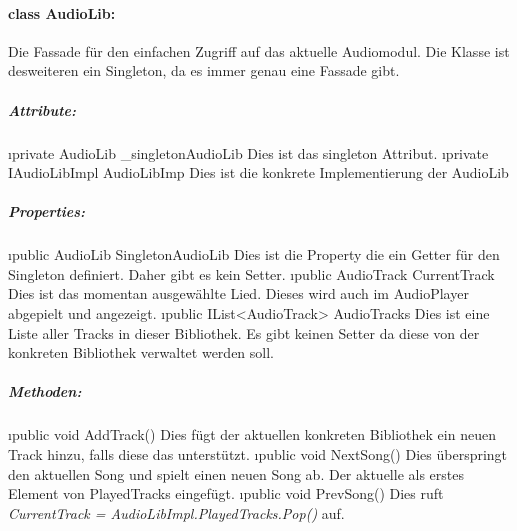\documentclass[../entwurf.tex]{subfiles}
\begin{document}
			\paragraph{class AudioLib:}
				Die Fassade für den einfachen Zugriff auf das aktuelle Audiomodul.
				Die Klasse ist desweiteren ein Singleton, da es immer genau eine Fassade gibt.
				\subparagraph{Attribute:}
					\begin{itemize}
						\i{private AudioLib \_singletonAudioLib} Dies ist das singleton Attribut.
						\i{private IAudioLibImpl AudioLibImp} Dies ist die konkrete Implementierung der
						AudioLib
					\end{itemize}
				\subparagraph{Properties:}
					\begin{itemize}
						\i{public AudioLib SingletonAudioLib} Dies ist die Property die ein Getter für den 
						Singleton definiert. Daher gibt es kein Setter.
						\i{public AudioTrack CurrentTrack} Dies ist das momentan ausgewählte Lied. Dieses
						wird auch im AudioPlayer abgepielt und angezeigt. 
						\i{public IList<AudioTrack> AudioTracks} Dies ist eine Liste aller Tracks in dieser 
						Bibliothek. Es gibt keinen Setter da diese von der konkreten Bibliothek verwaltet werden soll.
					\end{itemize}
				\subparagraph{Methoden:}
					\begin{itemize}
						\i{public void AddTrack()} Dies fügt der aktuellen konkreten Bibliothek ein neuen Track hinzu, 
						falls diese das unterstützt.
						\i{public void NextSong()} Dies überspringt den aktuellen Song und spielt einen neuen Song ab. 
						Der aktuelle als erstes Element von PlayedTracks eingefügt.
						\i{public void PrevSong()} Dies ruft \textit{CurrentTrack = AudioLibImpl.PlayedTracks.Pop()} auf.
					\end{itemize}
\end{document}
